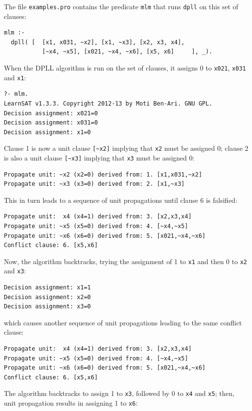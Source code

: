 \documentclass[11pt]{article}
\newcommand*{\p}[1]{\textup{\texttt{#1}}}
\begin{document}
The file \p{examples.pro} contains the predicate \p{mlm} that runs
\p{dpll} on this set of clauses:

\begin{verbatim}
mlm :-
  dpll( [  [x1, x031, ~x2], [x1, ~x3], [x2, x3, x4],
           [~x4, ~x5], [x021, ~x4, ~x6], [x5, x6]     ], _).
\end{verbatim}

When the DPLL algorithm is run on the set of clauses, it assigns
0 to \p{x021}, \p{x031} and \p{x1}:

\begin{verbatim}
?- mlm.
LearnSAT v1.3.3. Copyright 2012-13 by Moti Ben-Ari. GNU GPL.
Decision assignment: x021=0
Decision assignment: x031=0
Decision assignment: x1=0
\end{verbatim}

Clause 1 is now a unit clause \verb+[~x2]+ implying that \p{x2} must be
assigned 0; clause 2 is also a unit clause \verb+[~x3]+ implying that
\p{x3} must be assigned 0:

\begin{verbatim}
Propagate unit: ~x2 (x2=0) derived from: 1. [x1,x031,~x2]
Propagate unit: ~x3 (x3=0) derived from: 2. [x1,~x3]
\end{verbatim}

This in turn leads to a sequence of unit propagations until clause 6
is falsified:

\begin{verbatim}
Propagate unit:  x4 (x4=1) derived from: 3. [x2,x3,x4]
Propagate unit: ~x5 (x5=0) derived from: 4. [~x4,~x5]
Propagate unit: ~x6 (x6=0) derived from: 5. [x021,~x4,~x6]
Conflict clause: 6. [x5,x6]
\end{verbatim}

Now, the algorithm backtracks, trying the assignment of 1 to \p{x1} and
then 0 to \p{x2} and \p{x3}:
\begin{verbatim}
Decision assignment: x1=1
Decision assignment: x2=0
Decision assignment: x3=0
\end{verbatim}
which causes another sequence of unit propagations leading to the same
conflict clause:
\begin{verbatim}
Propagate unit:  x4 (x4=1) derived from: 3. [x2,x3,x4]
Propagate unit: ~x5 (x5=0) derived from: 4. [~x4,~x5]
Propagate unit: ~x6 (x6=0) derived from: 5. [x021,~x4,~x6]
Conflict clause: 6. [x5,x6]
\end{verbatim}

The algorithm backtracks to assign 1 to \p{x3}, followed by 0 to \p{x4}
and \p{x5}; then, unit propagation results in assigning 1 to \p{x6}:
\end{document}
